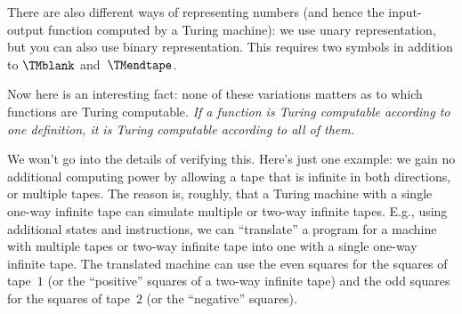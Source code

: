 \documentclass[../../../include/open-logic-section]{subfiles}
\begin{document}
There are also different ways of representing numbers (and hence the
input-output function computed by a Turing machine): we use unary
representation, but you can also use binary representation. This
requires two symbols in addition to $\TMblank$ and~$\TMendtape$.

Now here is an interesting fact: none of these variations matters as
to which functions are Turing computable. \emph{If a function is Turing
computable according to one definition, it is Turing computable
according to all of them.}

We won't go into the details of verifying this. Here's just one
example: we gain no additional computing power by allowing a tape that
is infinite in both directions, or multiple tapes. The reason is,
roughly, that a Turing machine with a single one-way infinite tape can
simulate multiple or two-way infinite tapes. E.g., using additional
states and instructions, we can ``translate'' a program for a
machine with multiple tapes or two-way infinite tape into one with a
single one-way infinite tape.  The translated machine can use the
even squares for the squares of tape~$1$ (or the ``positive'' squares
of a two-way infinite tape) and the odd squares for the squares of
tape~$2$ (or the ``negative'' squares).
\end{document}
